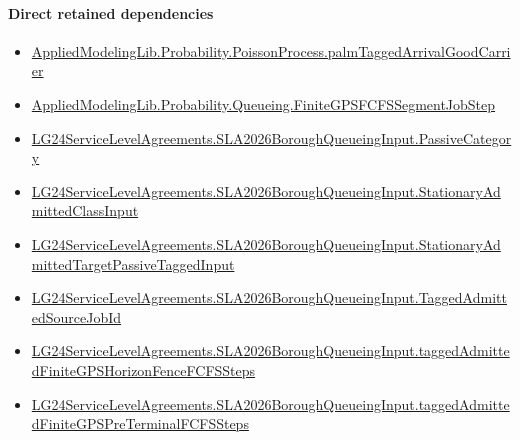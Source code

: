 \documentclass[10pt]{article}
\begin{document}
\paragraph{Direct retained dependencies}
\begin{itemize}\raggedright
\item \hyperlink{governing-declaration-ae13476c571ece6d}{Applied\allowbreak{}Modeling\allowbreak{}Lib.\allowbreak{}Probability.\allowbreak{}Poisson\allowbreak{}Process.\allowbreak{}palm\allowbreak{}Tagged\allowbreak{}Arrival\allowbreak{}Good\allowbreak{}Carrier}
\item \hyperlink{governing-declaration-8fcaf575fc5b34e1}{Applied\allowbreak{}Modeling\allowbreak{}Lib.\allowbreak{}Probability.\allowbreak{}Queueing.\allowbreak{}Finite\allowbreak{}GPSFCFS\allowbreak{}Segment\allowbreak{}Job\allowbreak{}Step}
\item \hyperlink{governing-declaration-abc91e26948cf0a3}{LG24\allowbreak{}Service\allowbreak{}Level\allowbreak{}Agreements.\allowbreak{}SLA2026\allowbreak{}Borough\allowbreak{}Queueing\allowbreak{}Input.\allowbreak{}Passive\allowbreak{}Category}
\item \hyperlink{governing-declaration-f3072ff54a3653c2}{LG24\allowbreak{}Service\allowbreak{}Level\allowbreak{}Agreements.\allowbreak{}SLA2026\allowbreak{}Borough\allowbreak{}Queueing\allowbreak{}Input.\allowbreak{}Stationary\allowbreak{}Admitted\allowbreak{}Class\allowbreak{}Input}
\item \hyperlink{governing-declaration-8796a25a610eaea9}{LG24\allowbreak{}Service\allowbreak{}Level\allowbreak{}Agreements.\allowbreak{}SLA2026\allowbreak{}Borough\allowbreak{}Queueing\allowbreak{}Input.\allowbreak{}Stationary\allowbreak{}Admitted\allowbreak{}Target\allowbreak{}Passive\allowbreak{}Tagged\allowbreak{}Input}
\item \hyperlink{governing-declaration-03f187b908407c39}{LG24\allowbreak{}Service\allowbreak{}Level\allowbreak{}Agreements.\allowbreak{}SLA2026\allowbreak{}Borough\allowbreak{}Queueing\allowbreak{}Input.\allowbreak{}Tagged\allowbreak{}Admitted\allowbreak{}Source\allowbreak{}Job\allowbreak{}Id}
\item \hyperlink{governing-declaration-89953ee3c5f329cc}{LG24\allowbreak{}Service\allowbreak{}Level\allowbreak{}Agreements.\allowbreak{}SLA2026\allowbreak{}Borough\allowbreak{}Queueing\allowbreak{}Input.\allowbreak{}tagged\allowbreak{}Admitted\allowbreak{}Finite\allowbreak{}GPS\allowbreak{}Horizon\allowbreak{}Fence\allowbreak{}FCFS\allowbreak{}Steps}
\item \hyperlink{governing-declaration-f4da7440d5fb1739}{LG24\allowbreak{}Service\allowbreak{}Level\allowbreak{}Agreements.\allowbreak{}SLA2026\allowbreak{}Borough\allowbreak{}Queueing\allowbreak{}Input.\allowbreak{}tagged\allowbreak{}Admitted\allowbreak{}Finite\allowbreak{}GPS\allowbreak{}Pre\allowbreak{}Terminal\allowbreak{}FCFS\allowbreak{}Steps}
\end{itemize}
\hypertarget{governing-declaration-9fb2ae13890b5aa8}{}
\end{document}
